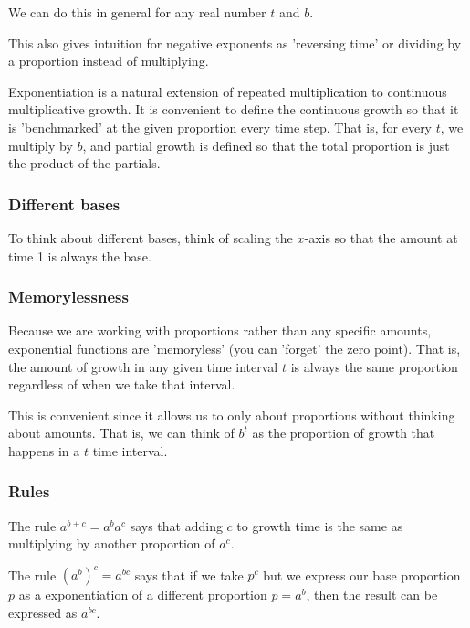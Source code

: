 \documentclass[../main.tex]{subfiles}
\begin{document}
We can do this in general for any real number \( t \) and \( b \).



This also gives intuition for negative exponents
as 'reversing time' or dividing by a proportion instead of multiplying.

Exponentiation is a natural extension of repeated multiplication
to continuous multiplicative growth.
It is convenient to define the continuous growth so that it is 'benchmarked'
at the given proportion every time step.
That is, for every \( t \), we multiply by \( b \),
and partial growth is defined so that the total proportion is just the product of the partials.

\newpage
\subsubsection{Different bases}

To think about different bases, think of scaling the \( x \)-axis so that
the amount at time 1 is always the base.



\subsubsection{Memorylessness}

Because we are working with proportions rather than any specific amounts,
exponential functions are 'memoryless' (you can 'forget' the zero point).
That is, the amount of growth in any given time interval \( t \)
is always the same proportion regardless of when we take that interval.



This is convenient since it allows us to only about proportions
without thinking about amounts.
That is, we can think of \( b^t \) as the proportion of growth that happens in a \( t \)
time interval.

\newpage
\subsubsection{Rules}

The rule \( a^{b+c} = a^b a^c \) says that adding \( c \) to growth time
is the same as multiplying by another proportion of \( a^c \).



The rule \( (a^{b})^{c} = a^{bc} \) says that if we take \( p^c \)
but we express our base proportion \( p \)
as a exponentiation of a different proportion \( p = a^b \),
then the result can be expressed as \( a^{bc} \).
\end{document}
